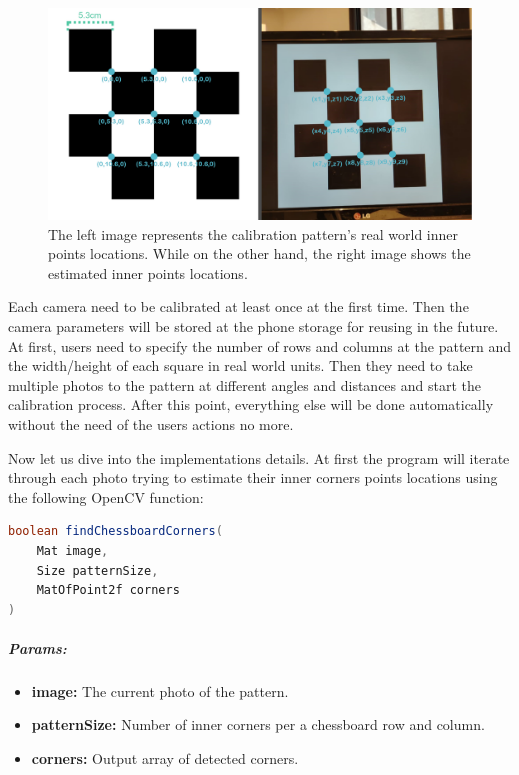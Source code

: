 \begin{figure}[h] %
	\centering
	\includegraphics[width=\textwidth]{assets/ch3/calibration illustration image/calibration illustration image.png}
	\caption{ The left image represents the calibration pattern's real world inner points locations. While on the other hand, the right image shows the estimated inner  points locations. }
	\label{Calibration_Illustrator}
\end{figure}

Each camera need to be calibrated at least once at the first time. Then the camera parameters will be stored at the phone storage for reusing in the future. At first, users need to specify the number of rows and columns at the pattern and the width/height of each square in real world units. Then they need to take multiple photos to the pattern at different angles and distances and start the calibration process. After this point, everything else will be done automatically without the need of the users actions no more. 

Now let us dive into the implementations details. At first the program will iterate through each photo trying to estimate their inner corners points locations using the following OpenCV function:
\begin{lstlisting}[language=Java]
boolean findChessboardCorners(
	Mat image,
	Size patternSize,
	MatOfPoint2f corners
)
\end{lstlisting}

\subparagraph{Params:}

\begin{itemize}
	\item \textbf{image:}
	The current photo of the pattern.
	\item \textbf{patternSize:}
	Number of inner corners per a chessboard row and column.
	\item \textbf{corners:}
	Output array of detected corners.
\end{itemize}


